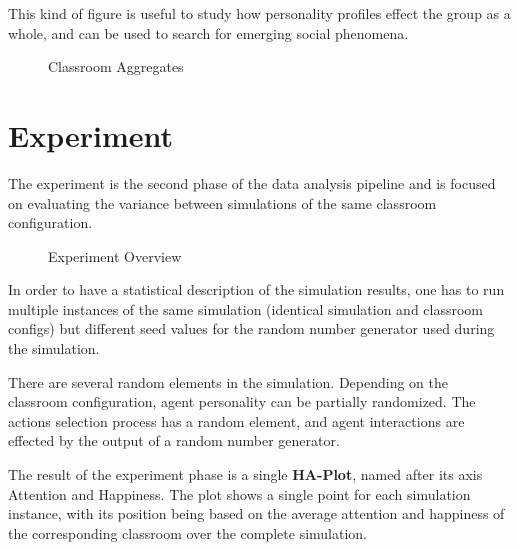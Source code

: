 This kind of figure is useful to study how personality profiles effect the group
as a whole, and can be used to search for emerging social phenomena.

\begin{figure}[]
    \hspace*{-1.0\leftmargin}
    \caption{Classroom Aggregates}
    \label{ClassroomAggregates}
\end{figure}



\section{Experiment}
The experiment is the second phase of the data analysis pipeline and is focused
on evaluating the variance between simulations of the same classroom configuration.

\begin{figure}[H]
    \caption{Experiment Overview}
    \label{ExperimentOverview}
\end{figure}

In order to have a statistical description of the simulation results, one has to
run multiple instances of the same simulation (identical simulation  and classroom
configs) but different seed values for the random number generator used during the simulation.

There are several random elements in the simulation. Depending on the classroom
configuration, agent personality can be partially randomized. The actions selection
process has a random element, and agent interactions are effected by the output of
a random number generator.

\bb

The result of the experiment phase is a single \textbf{HA-Plot}, named after
its axis Attention and Happiness. The plot shows a single point for each simulation
instance, with its position being based on the average attention and happiness of
the corresponding classroom over the complete simulation.

